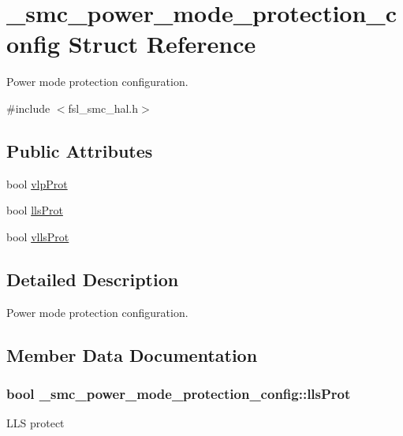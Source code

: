 \hypertarget{struct__smc__power__mode__protection__config}{}\section{\+\_\+smc\+\_\+power\+\_\+mode\+\_\+protection\+\_\+config Struct Reference}
\label{struct__smc__power__mode__protection__config}


Power mode protection configuration.  




{\ttfamily \#include $<$fsl\+\_\+smc\+\_\+hal.\+h$>$}

\subsection*{Public Attributes}
\begin{DoxyCompactItemize}
\item 
bool \hyperlink{struct__smc__power__mode__protection__config_a2a3db9c5cd8ba9ad935300c64feb68a9}{vlp\+Prot}
\item 
bool \hyperlink{struct__smc__power__mode__protection__config_a2bd375ecf03c834dd15f07a17391a889}{lls\+Prot}
\item 
bool \hyperlink{struct__smc__power__mode__protection__config_ae79a6aa027e6f5a2177bed8c5d208fd7}{vlls\+Prot}
\end{DoxyCompactItemize}


\subsection{Detailed Description}
Power mode protection configuration. 

\subsection{Member Data Documentation}
\subsubsection[{\texorpdfstring{lls\+Prot}{llsProt}}]{\setlength{\rightskip}{0pt plus 5cm}bool \+\_\+smc\+\_\+power\+\_\+mode\+\_\+protection\+\_\+config\+::lls\+Prot}\hypertarget{struct__smc__power__mode__protection__config_a2bd375ecf03c834dd15f07a17391a889}{}\label{struct__smc__power__mode__protection__config_a2bd375ecf03c834dd15f07a17391a889}
L\+LS protect 
